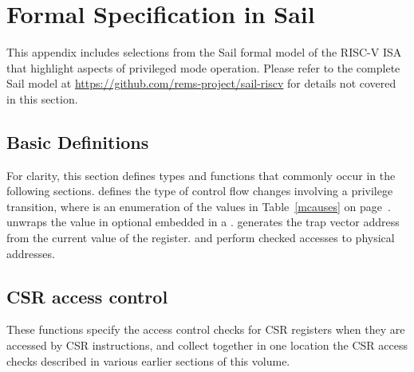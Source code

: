\chapter{Formal Specification in Sail}
\label{chap:priv-sail-model}

This appendix includes selections from the Sail formal model of the
RISC-V ISA that highlight aspects of privileged mode operation.
Please refer to the complete Sail model at
\url{https://github.com/rems-project/sail-riscv} for details not
covered in this section.

\section{Basic Definitions}
\label{s:priv-sail-basic-defs}

For clarity, this section defines types and functions that commonly
occur in the following sections.   defines the
type of control flow changes involving a privilege transition, where
 is an enumeration of the values in
Table~\ref{mcauses} on page~\pageref{mcauses}. 
unwraps the value in optional  embedded in a
.   generates the
trap vector address from the current value of the 
register.   and
 perform checked accesses to physical
addresses.

\begin{formalspec}
  \sailfnprivLevelToBits
  \sailtypesyncException
  \sailtypectlResult
  \sailfntval
  \sailfntvecAddr
  \sailfnpcAlignmentMask
  \sailfncheckedMemRead
  \sailfncheckedMemWrite
\end{formalspec}

\section{CSR access control}
\label{s:priv-sail-csr-access}

These functions specify the access control checks for CSR registers
when they are accessed by CSR instructions, and collect together in
one location the CSR access checks described in various earlier
sections of this volume.

\begin{formalspec}
  \sailfncsrAccess
  \sailfncsrPriv
  \sailfnisCSRDefined
  \sailfncheckCSRAccess
  \sailfncheckTVMSATP
  \sailfncheckCounteren
  \sailfncheckCSR
\end{formalspec}

